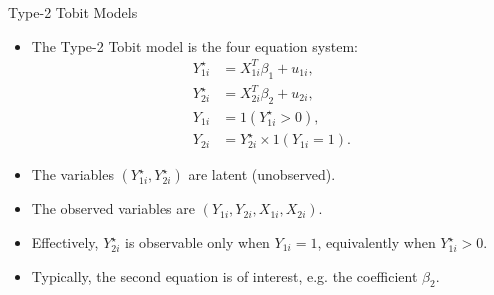 \documentclass[xcolor=svgnames,dvipdfmx,cjk]{beamer}
\theoremstyle{example}
\begin{document}
\begin{frame}{Type-2 Tobit Models}
      \begin{itemize}
            \item The Type-2 Tobit model is the four equation system:
                  \begin{align*}
                        Y_{1i}^{\star} &= X_{1i}^T \beta_1 + u_{1i},\\
                        Y_{2i}^{\star} &= X_{2i}^T \beta_2 + u_{2i},\\
                        Y_{1i}         &= 1(Y_{1i}^{\star} > 0),\\
                        Y_{2i}         &= Y_{2i}^{\star} \times 1(Y_{1i} = 1).
                  \end{align*}
            \item The variables $(Y_{1i}^{\star}, Y_{2i}^{\star})$ are latent (unobserved).
            \item The observed variables are $( Y_{1i}, Y_{2i}, X_{1i}, X_{2i})$.
            \item Effectively, $Y_{2i}^{\star}$ is observable only when $Y_{1i} = 1$, equivalently when $Y_{1i}^{\star} > 0$.
            \item Typically, the second equation is of interest, e.g. the coefficient $\beta_2$. 
      \end{itemize}
\end{frame}
\end{document}
